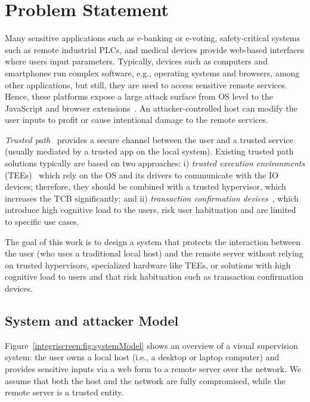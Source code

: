\section{Problem Statement}
\label{sec:problemStatement_IS}

Many sensitive applications such as e-banking or e-voting, safety-critical systems such as remote industrial PLCs, and medical devices provide web-based interfaces where users input parameters. Typically, devices such as computers and smartphones run complex software, e.g., operating systems and browsers, among other applications, but still, they are used to access sensitive remote services. Hence, these platforms expose a large attack surface from OS level to the JavaScript and browser extensions~\cite{driveByDownload, extensionSecurity, extensionSecurity1, extensionHack1, microsoftPatches, kernelSecurity, linuxMalware, zeusMalware, wannacry}. An attacker-controlled host can modify the user inputs to profit or cause intentional damage to the remote services.

\emph{Trusted path}~\cite{x86} provides a secure channel between the user and a trusted service (usually mediated by a trusted app on the local system). Existing trusted path solutions typically are based on two approaches: i) \textit{trusted execution environments} (TEEs)~\cite{sgxio} which rely on the OS and its drivers to communicate with the IO devices; therefore, they should be combined with a trusted hypervisor, which increases the TCB significantly; and ii) \textit{transaction confirmation devices}~\cite{filyanov2011uni}, which introduce high cognitive load to the users, risk user habituation and are limited to specific use cases.

The goal of this work is to design a system that protects the interaction between the user (who uses a traditional local host) and the remote server without relying on trusted hypervisors, specialized hardware like TEEs, or solutions with high cognitive load to users and that risk habituation such as transaction confirmation devices.

\subsection{System and attacker Model}
\label{sec:problemStatement:systemMode}

Figure~\ref{integriscreen:fig:systemModel} shows an overview of a visual supervision system: the user owns a local host (i.e., a desktop or laptop computer) and provides sensitive inputs via a web form to a remote server over the network. We assume that both the host and the network are fully compromised, while the remote server is a trusted entity. 

